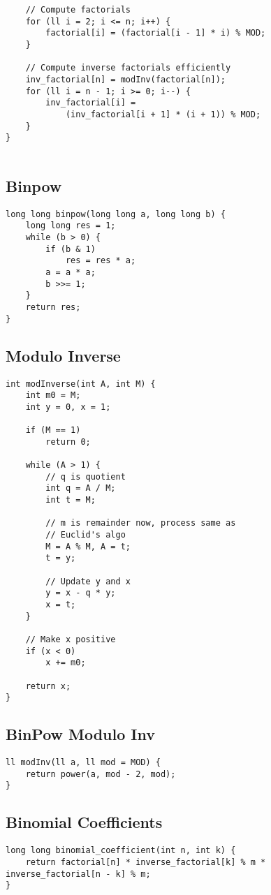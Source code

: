 \documentclass[10pt]{article}
\begin{document}
\begin{multicols*}{2}
\begin{lstlisting}
    // Compute factorials
    for (ll i = 2; i <= n; i++) {
        factorial[i] = (factorial[i - 1] * i) % MOD;
    }
    
    // Compute inverse factorials efficiently
    inv_factorial[n] = modInv(factorial[n]);
    for (ll i = n - 1; i >= 0; i--) {
        inv_factorial[i] = 
            (inv_factorial[i + 1] * (i + 1)) % MOD;
    }
}
 
\end{lstlisting}

\subsection{Binpow}
\begin{lstlisting}[style=compactcpp]
long long binpow(long long a, long long b) {
    long long res = 1;
    while (b > 0) {
        if (b & 1)
            res = res * a;
        a = a * a;
        b >>= 1;
    }
    return res;
}
\end{lstlisting}
\subsection{Modulo Inverse}
\begin{lstlisting}[style=compactcpp]
int modInverse(int A, int M) {
    int m0 = M;
    int y = 0, x = 1;

    if (M == 1)
        return 0;

    while (A > 1) {
        // q is quotient
        int q = A / M;
        int t = M;

        // m is remainder now, process same as
        // Euclid's algo
        M = A % M, A = t;
        t = y;

        // Update y and x
        y = x - q * y;
        x = t;
    }

    // Make x positive
    if (x < 0)
        x += m0;

    return x;
}
\end{lstlisting}

\subsection{BinPow Modulo Inv}
\begin{lstlisting}
ll modInv(ll a, ll mod = MOD) {
    return power(a, mod - 2, mod);
}

\end{lstlisting}
\subsection{Binomial Coefficients}
\begin{lstlisting}[style=compactcpp]
long long binomial_coefficient(int n, int k) {
    return factorial[n] * inverse_factorial[k] % m * inverse_factorial[n - k] % m;
}
\end{lstlisting}

\end{multicols*}
\end{document}
